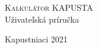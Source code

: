 \documentclass[a4paper, 11pt]{article}
\begin{document}
    \begin{titlepage}
    	\begin{center}
    		\Huge
    			\textsc{Kalkulátor KAPUSTA} \\
    		        Uživateľská príručka
    		\begin{figure}[h]
    	        \centering
    		\end{figure}
		\end{center}

		{\Large
			Kapustniaci \hfill 2021
		}
    \end{titlepage}
    
    \tableofcontents
    
    \newpage
    
\end{document}
